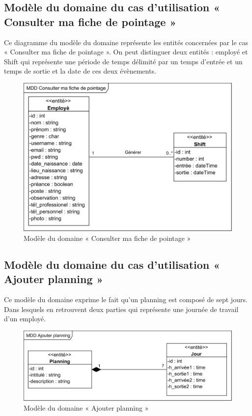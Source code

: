 \begin{itemize}
        \subsection*{Modèle du domaine du cas d'utilisation « Consulter ma fiche de pointage »}
         Ce diagramme du modèle du domaine représente les entités concernées par le cas « Consulter ma fiche de pointage ». On peut distinguer deux entités : employé et Shift qui représente une période de temps délimité par un temps d’entrée et un temps de sortie et la date de ces deux évènements.
         \clearpage
            \begin{figure}[h!]
                 \centering
                \includegraphics[scale=1.168]{images/MDD/MDD Consulter ma fiche de pointage.png}
                 \caption{Modèle du domaine « Consulter ma fiche de pointage »}
                 \label{fig13}
            \end{figure}
            
        \subsection*{Modèle du domaine du cas d'utilisation « Ajouter planning »}
         Ce modèle du domaine exprime le fait qu’un planning est composé de sept jours. Dans lesquels en retrouvent deux parties qui représente une journée de travail d’un employé.
         
            \begin{figure}[h!]
                 \centering
                \includegraphics[scale=1.12]{images/MDD/MDD Ajouter planning.png}
                 \caption{Modèle du domaine « Ajouter planning »}
                 \label{fig14}
            \end{figure}
        

\end{itemize}
